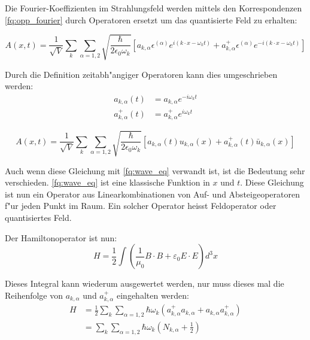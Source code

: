 Die Fourier-Koeffizienten im Strahlungsfeld werden mittels den Korrespondenzen \ref{fq:opp_fourier} durch Operatoren ersetzt um das quantisierte Feld zu erhalten:

\begin{equation*}
A(x,t) = \frac{1}{\sqrt{V}} \sum_k \sum_{\alpha=1,2} \sqrt{\frac{\hbar}{2 \epsilon_0 \omega_k}} \left[a_{k,\alpha} \epsilon^{(\alpha)} e^{i (k \cdot x - \omega_k t)} + a^+_{k,\alpha} \epsilon^{(\alpha)} e^{-i (k \cdot x - \omega_k t)}\right]
\end{equation*}

Durch die Definition zeitabh"angiger Operatoren kann dies umgeschrieben werden:
\begin{align*}
a_{k,\alpha}(t) &= a_{k,\alpha} e^{-i \omega_k t} \\
a^+_{k,\alpha}(t) &= a^+_{k,\alpha} e^{i \omega_k t}
\end{align*}

\begin{equation*}
A(x,t) = \frac{1}{\sqrt{V}} \sum_k \sum_{\alpha=1,2} \sqrt{\frac{\hbar}{2 \epsilon_0 \omega_k}}\left[a_{k,\alpha}(t) u_{k,\alpha}(x) + a^+_{k,\alpha}(t) \bar{u}_{k,\alpha}(x) \right]
\end{equation*}

Auch wenn diese Gleichung mit \ref{fq:wave_eq} verwandt ist, ist die Bedeutung sehr verschieden. \ref{fq:wave_eq} ist eine klassische Funktion in $x$ und $t$. Diese Gleichung ist nun ein Operator aus Linearkombinationen von Auf- und Absteigeoperatoren f"ur jeden Punkt im Raum. Ein solcher Operator heisst Feldoperator oder quantisiertes Feld.

Der Hamiltonoperator ist nun:
\begin{equation*}
H = \frac{1}{2} \int \left(\frac{1}{\mu_0} B \cdot B + \varepsilon_0 E \cdot E \right) d^3 x
\end{equation*}

Dieses Integral kann wiederum ausgewertet werden, nur muss dieses mal die Reihenfolge von $a_{k,\alpha}$ und $a^+_{k,\alpha}$ eingehalten werden:
\begin{equation*}
\begin{split}
H &= \frac{1}{2} \sum_k \sum_{\alpha=1,2} \hbar \omega_k \left(a^+_{k,\alpha} a_{k,\alpha} + a_{k,\alpha} a^+_{k,\alpha}\right) \\
&= \sum_k \sum_{\alpha=1,2} \hbar \omega_k \left(N_{k,\alpha} + \frac{1}{2} \right)
\end{split}
\end{equation*}

